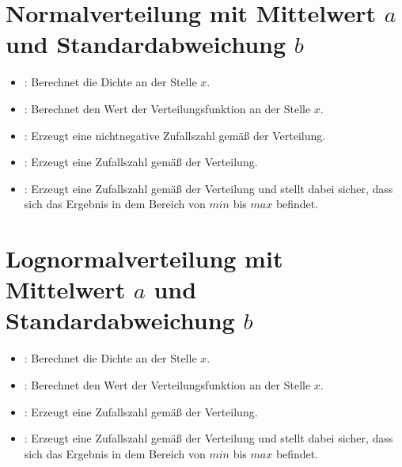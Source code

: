 \section{Normalverteilung mit Mittelwert \texorpdfstring{$a$}{a} und Standardabweichung \texorpdfstring{$b$}{b}}

\begin{itemize}

\item
{}:
Berechnet die Dichte an der Stelle $x$.

\item
{}:
Berechnet den Wert der Verteilungsfunktion an der Stelle $x$.

\item
{}:
Erzeugt eine nichtnegative Zufallszahl gemäß der Verteilung.

\item
{}:
Erzeugt eine Zufallszahl gemäß der Verteilung.

\item
{}:
Erzeugt eine Zufallszahl gemäß der Verteilung und stellt dabei sicher, dass sich das Ergebnis in dem Bereich von $min$ bis $max$ befindet.

\end{itemize}



\section{Lognormalverteilung mit Mittelwert \texorpdfstring{$a$}{a} und Standardabweichung \texorpdfstring{$b$}{b}}

\begin{itemize}

\item
{}:
Berechnet die Dichte an der Stelle $x$.

\item
{}:
Berechnet den Wert der Verteilungsfunktion an der Stelle $x$.

\item
{}:
Erzeugt eine Zufallszahl gemäß der Verteilung.

\item
{}:
Erzeugt eine Zufallszahl gemäß der Verteilung und stellt dabei sicher, dass sich das Ergebnis in dem Bereich von $min$ bis $max$ befindet.

\end{itemize}



